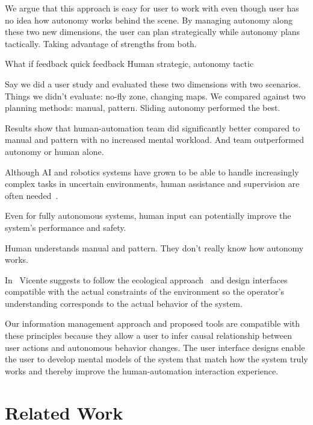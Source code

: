 \documentclass[journal]{IEEEtran}
\begin{document}
We argue that this approach is easy for user to work with even though user has no idea how autonomy works behind the scene. By managing autonomy along these two new dimensions, the user can plan strategically while autonomy plans tactically. Taking advantage of strengths from both.

What if feedback
quick feedback
Human strategic, autonomy tactic


Say we did a user study and evaluated these two dimensions with two scenarios. Things we didn't evaluate: no-fly zone, changing maps.
We compared against two planning methods: manual, pattern. Sliding autonomy performed the best.


Results show that human-automation team did significantly better compared to manual and pattern with no increased mental workload. And team outperformed autonomy or human alone.








Although AI and robotics systems have grown to be able to handle increasingly complex tasks in uncertain environments, human assistance and supervision are often needed~\cite{Bainbridge1983Ironies}. 



Even for fully autonomous systems, human input can potentially improve the system's performance and safety. 




Human understands manual and pattern.
They don't really know how autonomy works.


In~\cite{Vicente1997Should} Vicente suggests to follow the ecological approach~\cite{Rasmussen1994Cognitive} and design interfaces compatible with the actual constraints of the environment so the operator's understanding corresponds to the actual behavior of the system. 

Our information management approach and proposed tools are compatible with these principles because they allow a user to infer causal relationship between user actions and autonomous behavior changes. The user interface designs enable the user to develop mental models of the system that match how the system truly works and thereby improve the human-automation interaction experience.




\section{Related Work}
\label{sec:RelatedWork6}
\end{document}
